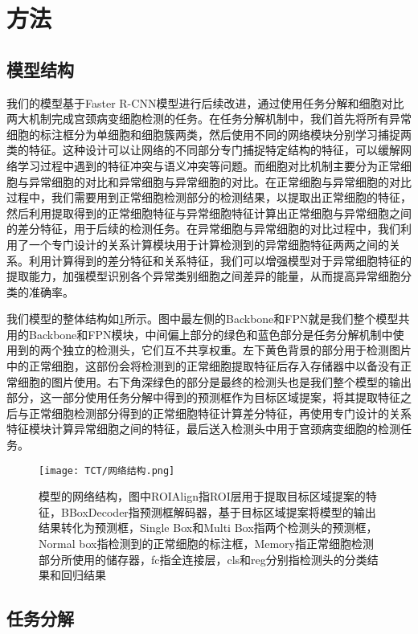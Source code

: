 \clearpage

\section{方法}

\subsection{模型结构}
\par 我们的模型基于Faster R-CNN模型进行后续改进，通过使用任务分解和细胞对比两大机制完成宫颈病变细胞检测的任务。在任务分解机制中，我们首先将所有异常细胞的标注框分为单细胞和细胞簇两类，然后使用不同的网络模块分别学习捕捉两类的特征。这种设计可以让网络的不同部分专门捕捉特定结构的特征，可以缓解网络学习过程中遇到的特征冲突与语义冲突等问题。而细胞对比机制主要分为正常细胞与异常细胞的对比和异常细胞与异常细胞的对比。在正常细胞与异常细胞的对比过程中，我们需要用到正常细胞检测部分的检测结果，以提取出正常细胞的特征，然后利用提取得到的正常细胞特征与异常细胞特征计算出正常细胞与异常细胞之间的差分特征，用于后续的检测任务。在异常细胞与异常细胞的对比过程中，我们利用了一个专门设计的关系计算模块用于计算检测到的异常细胞特征两两之间的关系。利用计算得到的差分特征和关系特征，我们可以增强模型对于异常细胞特征的提取能力，加强模型识别各个异常类别细胞之间差异的能量，从而提高异常细胞分类的准确率。
\par 我们模型的整体结构如\ref{pic:网络结构}所示。图中最左侧的Backbone和FPN就是我们整个模型共用的Backbone和FPN模块，中间偏上部分的绿色和蓝色部分是任务分解机制中使用到的两个独立的检测头，它们互不共享权重。左下黄色背景的部分用于检测图片中的正常细胞，这部份会将检测到的正常细胞提取特征后存入存储器中以备没有正常细胞的图片使用。右下角深绿色的部分是最终的检测头也是我们整个模型的输出部分，这一部分使用任务分解中得到的预测框作为目标区域提案，将其提取特征之后与正常细胞检测部分得到的正常细胞特征计算差分特征，再使用专门设计的关系特征模块计算异常细胞之间的特征，最后送入检测头中用于宫颈病变细胞的检测任务。
\begin{figure}[h]
    \centering
    \texttt{[image: TCT/网络结构.png]}
    \caption{模型的网络结构，图中ROIAlign指ROI层用于提取目标区域提案的特征，BBoxDecoder指预测框解码器，基于目标区域提案将模型的输出结果转化为预测框，Single Box和Multi Box指两个检测头的预测框，Normal box指检测到的正常细胞的标注框，Memory指正常细胞检测部分所使用的储存器，fc指全连接层，cls和reg分别指检测头的分类结果和回归结果}
    \label{pic:网络结构}
\end{figure}

\subsection{任务分解}
\label{sec:任务分解}
